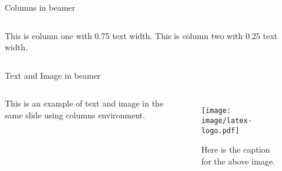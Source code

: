 \documentclass{beamer}
\begin{document}


\begin{frame}{Columns in beamer}
  \begin{columns}
    \centering
    This is column one with 0.75 text width.
    \centering
    This is column two with 0.25 text width.
  \end{columns}
\end{frame}

\begin{frame}{Text and Image in beamer}
  \begin{columns}
    This is an example of text and image in the same slide using columns environment.
    \begin{figure}
      \centering
      \texttt{[image: image/latex-logo.pdf]}
      \caption{Here is the caption for the above image. }
    \end{figure}
  \end{columns}
\end{frame}
\end{document}
